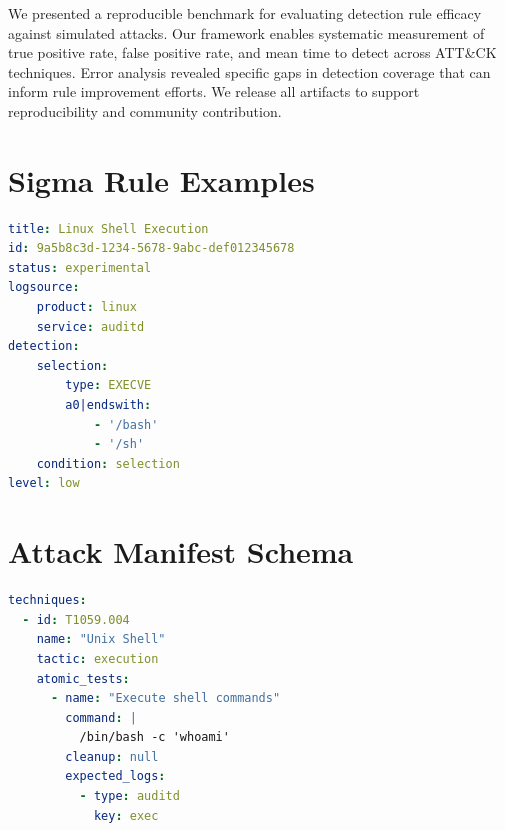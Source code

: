 \documentclass[11pt,a4paper]{article}
\begin{document}
We presented a reproducible benchmark for evaluating detection rule efficacy against simulated attacks. Our framework enables systematic measurement of true positive rate, false positive rate, and mean time to detect across ATT\&CK techniques. Error analysis revealed specific gaps in detection coverage that can inform rule improvement efforts. We release all artifacts to support reproducibility and community contribution.


% 

\appendix

\section{Sigma Rule Examples}

\begin{lstlisting}[language=yaml,caption={Example Sigma Rule for Unix Shell Execution}]
title: Linux Shell Execution
id: 9a5b8c3d-1234-5678-9abc-def012345678
status: experimental
logsource:
    product: linux
    service: auditd
detection:
    selection:
        type: EXECVE
        a0|endswith:
            - '/bash'
            - '/sh'
    condition: selection
level: low
\end{lstlisting}

\section{Attack Manifest Schema}

\begin{lstlisting}[language=yaml,caption={Attack Manifest Structure}]
techniques:
  - id: T1059.004
    name: "Unix Shell"
    tactic: execution
    atomic_tests:
      - name: "Execute shell commands"
        command: |
          /bin/bash -c 'whoami'
        cleanup: null
        expected_logs:
          - type: auditd
            key: exec
\end{lstlisting}
\end{document}
